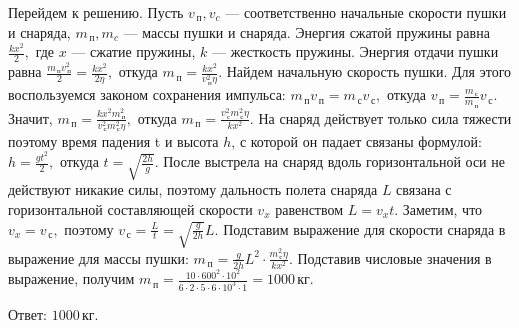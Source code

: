 \documentclass[12pt,a4paper]{article}
\begin{document}
{Перейдем к решению. 
Пусть $v _{\,\text{п}}, v _c$  — соответственно начальные скорости пушки и снаряда, $m_{\,\text{п}},m_c$  — массы пушки и снаряда. Энергия сжатой пружины равна $\frac{kx ^2}{2} ,$ где $x$  — сжатие пружины, $k$  — жесткость пружины. Энергия отдачи пушки равна $\frac{m_{\,\text{п}} v _{\,\text{п}} ^2}{2} = \frac{kx ^2}{2\eta} ,$ откуда $m_{\,\text{п}} = \frac{kx ^2}{v _{\,\text{п}} ^2 \eta} .$ 
Найдем начальную скорость пушки. Для этого воспользуемся законом сохранения импульса: $m_{\,\text{п}} v _{\,\text{п}} = m_{\,\text{с}} v _{\,\text{с}},$ откуда $v _{\,\text{п}} = \frac{m_{\,\text{с}}}{m_{\,\text{п}}} v _{\,\text{с}}.$ Значит, $m_{\,\text{п}} = \frac{kx ^2 m_{\,\text{п}} ^2}{v _{\,\text{с}} ^2 m_{\,\text{с}} ^2 \eta} ,$ откуда $m_{\,\text{п}} = \frac{v _{\,\text{с}} ^2 m_{\,\text{с}} ^2 \eta}{kx ^2} .$
На снаряд действует только сила тяжести поэтому время падения t и высота $h$, с которой он падает связаны формулой: $h = \frac{gt ^2}{2} ,$ откуда $t = \sqrt{\frac{2h}{g}} .$ После выстрела на снаряд вдоль горизонтальной оси не действуют никакие силы, поэтому дальность полета снаряда $L$ связана с горизонтальной составляющей скорости $v _x$ равенством $L = v _x t.$ Заметим, что $v _x = v _{\,\text{с}},$ поэтому $v _{\,\text{с}} = \frac{L}{t} = \sqrt{\frac{g}{2h}} L.$ 
Подставим выражение для скорости снаряда в выражение для массы пушки: $m_{\,\text{п}} = \frac{g}{2h} L ^2 \cdot \frac{m_{\,\text{с}} ^2 \eta}{kx ^2} .$ 
Подставив числовые значения в выражение, получим $m_{\,\text{п}}= \frac{10 \cdot 600 ^2 \cdot 10 ^2}{6 \cdot 2 \cdot 5 \cdot 6 \cdot 10 ^3 \cdot 1} = 1000\,\text{кг}.$

Ответ: $1000\,\text{кг}$.
}
\end{document}
